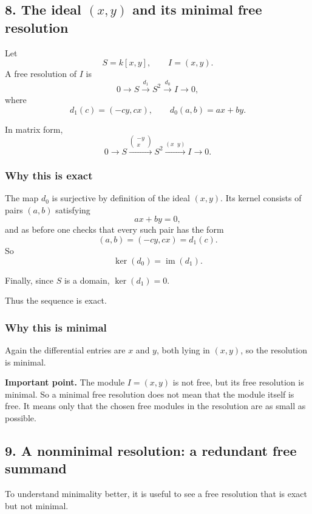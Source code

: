 \documentclass[12pt,a4paper]{article}
\theoremstyle{notespace}
\theoremstyle{definition}
\begin{document}
\subsection{8. The ideal \((x,y)\) and its minimal free resolution}

Let
\[
S=k[x,y],
\qquad
I=(x,y).
\]
A free resolution of \(I\) is
\[
0 \longrightarrow S \xrightarrow{d_1} S^2 \xrightarrow{d_0} I \longrightarrow 0,
\]
where
\[
d_1(c)=(-cy,cx),
\qquad
d_0(a,b)=ax+by.
\]

In matrix form,
\[
0 \longrightarrow S \xrightarrow{\begin{pmatrix}-y\\x\end{pmatrix}} S^2
\xrightarrow{(x\;\;y)} I \longrightarrow 0.
\]

\subsubsection*{Why this is exact}

The map \(d_0\) is surjective by definition of the ideal \((x,y)\).
Its kernel consists of pairs \((a,b)\) satisfying
\[
ax+by=0,
\]
and as before one checks that every such pair has the form
\[
(a,b)=(-cy,cx)=d_1(c).
\]
So
\[
\ker(d_0)=\operatorname{im}(d_1).
\]

Finally, since \(S\) is a domain, \(\ker(d_1)=0\).

Thus the sequence is exact.

\subsubsection*{Why this is minimal}

Again the differential entries are \(x\) and \(y\), both lying in \((x,y)\), so the resolution is minimal.

\medskip

\textbf{Important point.}
The module \(I=(x,y)\) is not free, but its free resolution is minimal.
So a minimal free resolution does not mean that the module itself is free.
It means only that the chosen free modules in the resolution are as small as possible.

\subsection{9. A nonminimal resolution: a redundant free summand}

To understand minimality better, it is useful to see a free resolution that is exact but not minimal.
\end{document}
